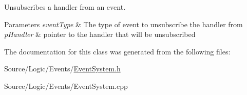 Unsubscribes a handler from an event. 


\begin{DoxyParams}{Parameters}
{\em event\+Type} & The type of event to unsubscribe the handler from \\
\hline
{\em p\+Handler} & pointer to the handler that will be unsubscribed \\
\hline
\end{DoxyParams}


The documentation for this class was generated from the following files\+:\begin{DoxyCompactItemize}
\item 
Source/\+Logic/\+Events/\mbox{\hyperlink{_event_system_8h}{Event\+System.\+h}}\item 
Source/\+Logic/\+Events/Event\+System.\+cpp\end{DoxyCompactItemize}
